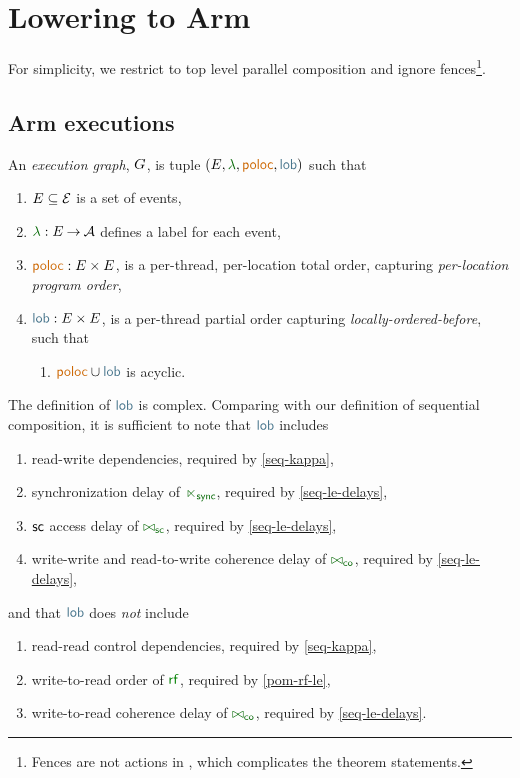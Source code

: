 \section{Lowering \PwTmcaTITLE{} to Arm}
\label{sec:arm}
For simplicity, we restrict to top level parallel composition and ignore
fences\footnote{Fences are not actions in \armeight{}, which complicates the
  theorem statements.}.

\subsection{Arm executions}
\begin{definition}
  An \emph{\armeight{} execution graph}, $G$, is tuple
  $(\aEvs, \labeling, {\rpoloc}, {\rlob})$ such that
  \begin{enumerate}[,label=(\textsc{a}\arabic*),ref=\textsc{a}\arabic*]
  \item $E\subseteq\mathcal{E}$ is a set of {events},
  \item $\labeling: \aEvs \fun \Act$ defines a {label} for each event,
  \item ${\rpoloc} : \aEvs\times\aEvs$, is a per-thread, per-location total
    order, capturing \emph{per-location program order},
  \item ${\rlob} : \aEvs\times\aEvs$, is a per-thread partial order capturing
    \emph{locally-ordered-before}, such that
    \begin{enumerate}
    \item \label{arm-lob-poloc}
      ${\rpoloc} \cup {\rlob}$ is acyclic.
    \end{enumerate}
  \end{enumerate}
\end{definition}

The definition of $\rlob$ is complex.  Comparing with our definition of
sequential composition, it is sufficient to note that $\rlob$ includes
\begin{enumerate}[label=(\textsc{l}\arabic*),ref=\textsc{l}\arabic*]
\item read-write dependencies, required by \ref{seq-kappa},
\item synchronization delay of ${\reorderra}$, required by \ref{seq-le-delays},
\item ${\mathsf{sc}}$ access delay of ${\eqreordersc}$, required by \ref{seq-le-delays},
\item write-write and read-to-write coherence delay of ${\eqreorderco}$, required by \ref{seq-le-delays},
\end{enumerate}
and that $\rlob$ does \emph{not} include
\begin{enumerate}[resume,label=(\textsc{l}\arabic*),ref=\textsc{l}\arabic*]
\item \label{lob-rr} 
  read-read control dependencies, required by \ref{seq-kappa},
\item \label{lob-rf}
  write-to-read order of $\rrfx$, required by \ref{pom-rf-le},
\item \label{lob-wr}
  write-to-read coherence delay of ${\eqreorderco}$, required by \ref{seq-le-delays}.
\end{enumerate}

